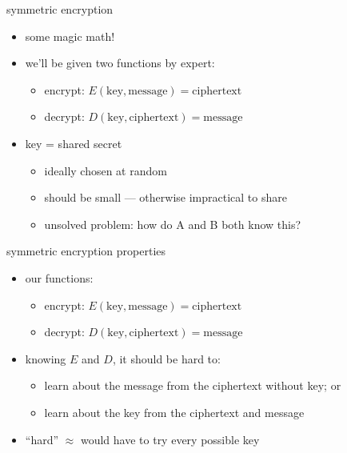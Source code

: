 \begin{frame}{symmetric encryption}
    \begin{itemize}
    \item some magic math!
    \vspace{.5cm}
    \item we'll be given two functions by expert:
        \begin{itemize}
        \item encrypt: $E(\text{key}, \text{message}) = \text{ciphertext}$
        \item decrypt: $D(\text{key}, \text{ciphertext}) = \text{message}$
        \end{itemize}
    \item key = shared secret
        \begin{itemize}
        \item ideally chosen at random
        \item should be small --- otherwise impractical to share
        \item unsolved problem: how do A and B both know this?
        \end{itemize}
    \end{itemize}
\end{frame}

\begin{frame}{symmetric encryption properties}
    \begin{itemize}
    \item our functions:
        \begin{itemize}
        \item encrypt: $E(\text{key}, \text{message}) = \text{ciphertext}$
        \item decrypt: $D(\text{key}, \text{ciphertext}) = \text{message}$
        \end{itemize}
    \item knowing $E$ and $D$, it should be hard to:
        \begin{itemize}
        \item learn about the message from the ciphertext without key; or
        \item learn about the key from the ciphertext and message
        \end{itemize}
    \item ``hard'' $\approx$ would have to try every possible key
    \end{itemize}
\end{frame}
